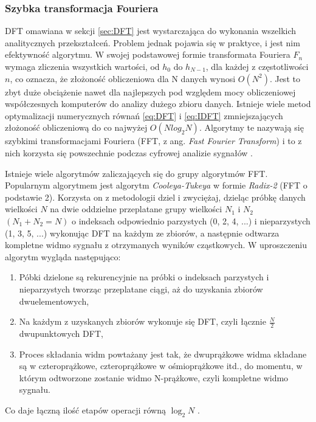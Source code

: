\documentclass[12pt,a4paper,twoside]{mwart}
\begin{document}
\subsubsection{Szybka transformacja Fouriera} \label{sec:FFT}
DFT omawiana w sekcji \ref{sec:DFT} jest wystarczająca do wykonania wszelkich analitycznych przekształceń. Problem jednak pojawia się w praktyce, i jest nim efektywność algorytmu. W swojej podstawowej formie transformata Fouriera $F_n$ wymaga zliczenia wszystkich wartości, od $h_0$ do $h_{N-1}$, dla każdej z częstotliwości $n$, co oznacza, że złożoność obliczeniowa dla N danych wynosi $O(N^2)$. Jest to zbyt duże obciążenie nawet dla najlepszych pod względem mocy obliczeniowej współczesnych komputerów do analizy dużego zbioru danych. Istnieje wiele metod optymalizacji numerycznych równań \ref{eq:DFT} i \ref{eq:IDFT} zmniejszających złożoność obliczeniową do co najwyżej $O(N log_2 N)$. Algorytmy te nazywają się szybkimi transformacjami Fouriera (FFT, z ang. \textit{Fast Fourier Transform}) i to z nich korzysta się powszechnie podczas cyfrowej analizie sygnałów \cite{Transcription:Tukey:FFT}.

Istnieje wiele algorytmów zaliczających się do grupy algorytmów FFT. Popularnym algorytmem jest algorytm \textit{Cooleya-Tukeya} w formie \textit{Radix-2} (FFT o podstawie 2). Korzysta on z metodologii dziel i zwyciężaj, dzieląc próbkę danych wielkości $N$ na dwie oddzielne przeplatane grupy wielkości $N_1$ i $N_2$ $(N_1 + N_2 = N)$ o indeksach odpowiednio parzystych (0, 2, 4, ...) i nieparzystych (1, 3, 5, ...) wykonując DFT na każdym ze zbiorów, a następnie odtwarza kompletne widmo sygnału z otrzymanych wyników cząstkowych. W uproszczeniu algorytm wygląda następująco:
\begin{enumerate}
  \item{Póbki dzielone są rekurencyjnie na próbki o indeksach parzystych i nieparzystych tworząc przeplatane ciągi, aż do uzyskania zbiorów dwuelementowych,}
  \item{Na każdym z uzyskanych zbiorów wykonuje się DFT, czyli łącznie $\frac{N}{2}$ dwupunktowych DFT,}
  \item{Proces składania widm powtażany jest tak, że dwuprążkowe widma składane są w czteroprążkowe, czteroprążkowe w ośmioprążkowe itd., do momentu, w którym odtworzone zostanie widmo N-prążkowe, czyli kompletne widmo sygnału.}
\end{enumerate}
Co daje łączną ilość etapów operacji równą $\log_2 N$ 
\cite[241-252]{CyfrowePrzetwarzanieSygnalowOdTeoriiDoZastosowan}.
\end{document}
